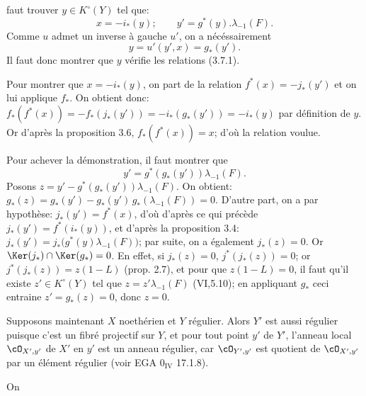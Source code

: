 faut trouver \(y\in K^\circ(Y)\) tel que:
\begin{equation}\tag{3.7.1}
x=-i_*(y);\qquad y'=g^*(y).\lambda_{-1}(F).
\end{equation}
Comme \(u\) admet un inverse à gauche \(u'\), on a nécéssairement
\[
y=u'(y',x)=g_*(y').
\]
Il faut donc montrer que \(y\) vérifie les relations (3.7.1).

Pour montrer que \(x=-i_*(y)\), on part de la relation \(f^*(x)=-j_*(y')\) et on lui applique \(f_*\). On obtient donc: \(f_*(f^*(x))=-f_*(j_*(y'))=-i_*(g_*(y'))=-i_*(y)\) par définition de \(y\). Or d'après la proposition 3.6, \(f_*(f^*(x))=x\); d'où la relation voulue.

Pour achever la démonstration, il faut montrer que
\[
y'=g^*(g_*(y'))\lambda_{-1}(F).
\]
Posons \(z=y'-g^*(g_*(y'))\lambda_{-1}(F)\). On obtient: \(g_*(z)=g_*(y')-g_*(y')\,g_*(\lambda_{-1}(F))=0\). D'autre part, on a par hypothèse: \(j_*(y')=f^*(x)\), d'où d'après ce qui précède \(j_*(y')=f^*(i_*(y))\), et d'après la proposition 3.4: \(j_*(y')=j_*\bigl(g^*(y)\lambda_{-1}(F)\bigr)\); par suite, on a également \(j_*(z)=0\). Or \(\Ker(j_*)\cap\Ker(g_*)=0\). En effet, si \(j_*(z)=0\), \(j^*(j_*(z))=0\); or \(j^*(j_*(z))=z(1-L)\) (prop. 2.7), et pour que \(z(1-L)=0\), il faut qu'il existe \(z'\in K^\circ(Y)\) tel que \(z=z'\lambda_{-1}(F)\) (VI,5.10); en appliquant \(g_*\) ceci entraine \(z'=g_*(z)=0\), donc \(z=0\).

Supposons maintenant \(X\) noethérien et \(Y\) régulier. Alors \(Y'\) est aussi régulier puisque c'est un fibré projectif sur \(Y\), et pour tout point \(y'\) de \(Y'\), l'anneau local \(\cO_{X',y'}\) de \(X'\) en \(y'\) est un anneau régulier, car \(\cO_{Y',y'}\) est quotient de \(\cO_{X',y'}\) par un élément régulier (voir EGA \(0_{\mathrm{IV}}\) 17.1.8).

On
